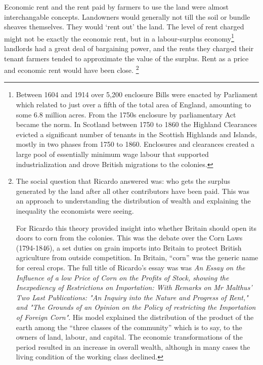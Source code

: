  Economic rent and the rent paid by farmers to use the land were almost interchangable concepts. Landowners would generally not %
 till the soil or bundle sheaves themselves. They would `rent out' the land. The level of rent charged might not be exactly the economic rent, but in a labour-surplus economy\footnote{Between 1604 and 1914 over 5,200 enclosure Bills were enacted by Parliament which related to just over a fifth of the total area of England, amounting to some 6.8 million acres. From the 1750s enclosure by parliamentary Act became the norm. In Scotland  between 1750 to 1860 the  Highland Clearances  evicted a significant number of tenants in the Scottish Highlands and Islands, mostly in two phases from 1750 to 1860. Enclosures and clearances created a large pool of essentially minimum wage labour that supported industrialization and drove British migrations to the colonies.} landlords had a great deal of bargaining power, and the rents they charged their tenant farmers tended to approximate the value of the surplus. Rent as a price and economic rent would have been close. %
 \footnote{The social question that Ricardo answered was: who gets the surplus generated by the land after all other contributors have been paid. This was an approach to understanding the distribution of wealth and explaining the inequality the economists were seeing. 
 
 For Ricardo this theory provided insight into whether Britain should open its doors to corn from the colonies. This was the debate over the Corn Laws (1794-1846), a set duties on grain imports into Britain to protect British agriculture from outside competition. In Britain, ``corn'' was the generic name for cereal crops. The full title of Ricardo's essay was was \textit{An Essay on the Influence of a low Price of Corn on the Profits of Stock, showing the Inexpediency of Restrictions on Importation: With Remarks on Mr Malthus' Two Last Publications: "An Inquiry into the Nature and Progress of Rent," and "The Grounds of an Opinion on the Policy of restricting the Importation of Foreign Corn"}.
His model  explained the distribution of the product of the earth among the “three classes of the community” which is to say, to the owners of land, labour, and capital.   %
The economic transformations of the period resulted in an increase in overall wealth, although in many cases the living condition of the working class declined.} %

